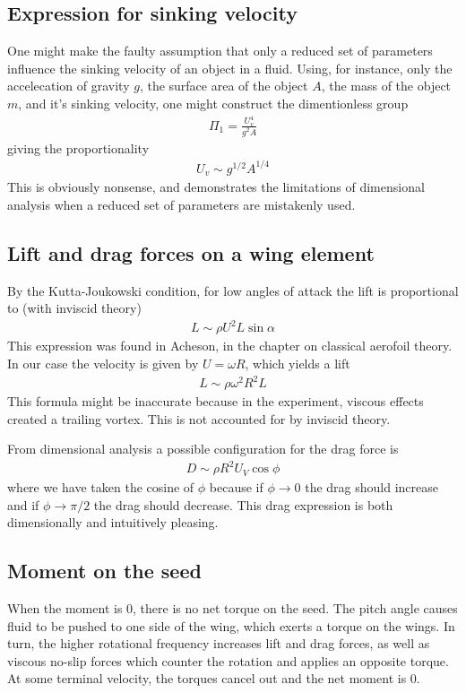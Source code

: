 \documentclass[aps,reprint]{revtex4-1}
\begin{document}
\subsection{Expression for sinking velocity}
One might make the faulty assumption that only a reduced set of parameters influence the sinking velocity of an object in a fluid. Using, for instance, only the accelecation of gravity $g$, the surface area of the object $A$, the mass of the object $m$, and it's sinking velocity, one might construct the dimentionless group
\begin{align*}
    \Pi_1 = \frac{U_v^4}{g^2A}
\end{align*}
giving the proportionality
\begin{align*}
    U_v \sim g^{1/2}A^{1/4}
\end{align*}
This is obviously nonsense, and demonstrates the limitations of dimensional analysis when a reduced set of parameters are mistakenly used.

\subsection{Lift and drag forces on a wing element}
By the Kutta-Joukowski condition, for low angles of attack the lift is
proportional to (with inviscid theory)
\begin{align*}
    L \sim \rho U^2 L \sin{\alpha}
\end{align*}
This expression was found in Acheson, in the chapter on classical aerofoil theory.
In our case the velocity is given by $U = \omega R$, which yields a lift
\begin{align}
  L \sim \rho \omega^2 R^2 L
\end{align}
This formula might be inaccurate because in the experiment, viscous effects
created a trailing vortex. This is not accounted for by inviscid theory.

From dimensional analysis a possible configuration for the drag force is
\begin{align}
  D \sim \rho R^2 U_V \cos{\phi}
\end{align}
where we have taken the cosine of $\phi$ because if $\phi \rightarrow 0$ the
drag should increase and if $\phi \rightarrow \pi/2$ the drag should decrease.
This drag expression is both dimensionally and intuitively pleasing.
\subsection{Moment on the seed}
\label{subsec:moment}
When the moment is 0, there is no net torque on the seed. The pitch angle causes
fluid to be pushed to one side of the wing, which exerts a torque on the wings.
In turn, the higher rotational frequency increases lift and drag forces, as well
as viscous no-slip forces which counter the rotation and applies an opposite
torque. At some terminal velocity, the torques cancel out and the net moment is
0.
\end{document}
